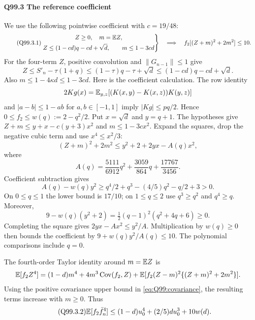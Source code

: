 \paragraph{Q99.3 The reference coefficient}\label{part:Q99.3}
We use the following pointwise coefficient with $c=\allowbreak 19/48$:
\begin{equation}\tag{Q99.3.1}\label{eq:Q99:coefficient}
 \left.
 \begin{gathered}
 Z\ge0,\quad m=\mathbb E Z,\\
 Z\le(1-cd)q-cd+\sqrt d,\qquad m\le1-3cd
 \end{gathered}\right\}
 \quad\Longrightarrow\quad f_2[(Z+m)^2+2m^2]\le10.
\end{equation}
For the four-term $Z$, positive convolution and
$\|G_{n-1}\|\le\allowbreak 1$ give
\[
 Z\le S'_n-\tau(1+q)\le(1-\tau)q-\tau+\sqrt d
 \le(1-cd)q-cd+\sqrt d.
\]
Also $m\le\allowbreak 1-4\kappa d\le\allowbreak 1-3cd$.
Here is the coefficient calculation. The row identity
\[
 2Kg(x)=\mathbb E_{y,z}[(K(x,y)-K(x,z))K(y,z)]
\]
and $|a-b|\le\allowbreak 1-ab$ for $a,\allowbreak b\in[-1,\allowbreak 1]$ imply $|Kg|\le\allowbreak  pq/2$.
Hence $0\le\allowbreak  f_2\le\allowbreak  w(q):=\allowbreak 2-q^2/2$.
Put $x=\allowbreak \sqrt d$ and $y=\allowbreak q+1$. The hypotheses give
$Z+m\le\allowbreak  y+x-c(y+3)x^2$ and $m\le\allowbreak 1-3cx^2$.
Expand the squares, drop the negative cubic term and use $x^4\le\allowbreak  x^2/3$:
\[
 (Z+m)^2+2m^2\le y^2+2+2yx-A(q)x^2,
\]
where
\[
 A(q)=\frac{5111}{6912}q^2+\frac{3059}{864}q+\frac{17767}{3456}.
\]
Coefficient subtraction gives
\[
 A(q)-w(q)y^2\ge q^4/2+q^3-(4/5)q^2-q/2+3>0.
\]
On $0\le\allowbreak  q\le\allowbreak 1$ the lower bound is $17/10$; on $1\le\allowbreak  q\le\allowbreak 2$ use
$q^3\ge\allowbreak  q^2$ and $q^4\ge\allowbreak  q$. Moreover,
\[
 9-w(q)(y^2+2)=\tfrac12(q-1)^2(q^2+4q+6)\ge0.
\]
Completing the square gives $2yx-Ax^2\le\allowbreak  y^2/A$.
Multiplication by $w(q)\ge\allowbreak 0$ then bounds the coefficient by
$9+w(q)y^2/A(q)\le\allowbreak 10$. The polynomial comparisons include $q=\allowbreak 0$.

The fourth-order Taylor identity around $m=\allowbreak \mathbb E Z$ is
\[
 \mathbb E[f_2Z^4]=(1-d)m^4+4m^3\operatorname{Cov}(f_2,Z)
 +\mathbb E[f_2(Z-m)^2\{(Z+m)^2+2m^2\}].
\]
Using the positive covariance upper bound in \eqref{eq:Q99:covariance},
the resulting terms increase with $m\ge\allowbreak 0$. Thus
\begin{equation}\tag{Q99.3.2}\label{eq:Q99:taylor}
 \mathbb E[f_2\bar f_n^4]\le(1-d)u_0^4+(2/5)du_0^3+10w(d).
\end{equation}

